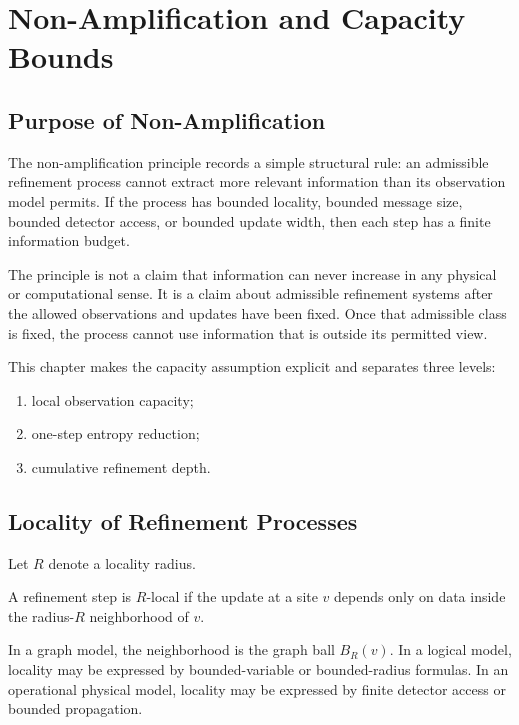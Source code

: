 \chapter{Non-Amplification and Capacity Bounds}

\section{Purpose of Non-Amplification}

The non-amplification principle records a simple structural rule: an
admissible refinement process cannot extract more relevant information than
its observation model permits. If the process has bounded locality, bounded
message size, bounded detector access, or bounded update width, then each step
has a finite information budget.

The principle is not a claim that information can never increase in any
physical or computational sense. It is a claim about admissible refinement
systems after the allowed observations and updates have been fixed. Once that
admissible class is fixed, the process cannot use information that is outside
its permitted view.

This chapter makes the capacity assumption explicit and separates three
levels:

\begin{enumerate}
\item local observation capacity;
\item one-step entropy reduction;
\item cumulative refinement depth.
\end{enumerate}

\section{Locality of Refinement Processes}

Let \(R\) denote a locality radius.

\begin{definition}
A refinement step is \(R\)-local if the update at a site \(v\) depends only on
data inside the radius-\(R\) neighborhood of \(v\).
\end{definition}

In a graph model, the neighborhood is the graph ball \(B_R(v)\). In a logical
model, locality may be expressed by bounded-variable or bounded-radius
formulas. In an operational physical model, locality may be expressed by
finite detector access or bounded propagation.

